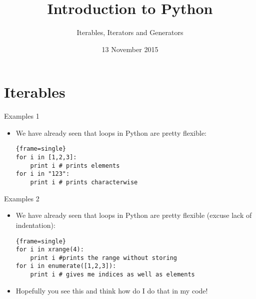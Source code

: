 \documentclass{beamer}
\title{Introduction to Python}
\subtitle{Iterables, Iterators and Generators}
\date{13 November 2015}
\begin{document}
\begin{frame}
  \titlepage
\end{frame}

\section{Iterables}
\begin{frame}[fragile]{Examples 1}
  \begin{itemize}
	\item {We have already seen that loops in Python are pretty flexible:
	\pause
  \begin{block}{}
\begin{lstlisting}{frame=single}
for i in [1,2,3]:
    print i # prints elements
for	i in "123":
    print i # prints characterwise
\end{lstlisting}
\end{block}
	}
  \end{itemize}
\end{frame}
\begin{frame}[fragile]{Examples 2}
  \begin{itemize}
	\item {We have already seen that loops in Python are pretty flexible (excuse lack of indentation):
  \begin{block}{}
\begin{lstlisting}{frame=single}
for i in xrange(4):
    print i #prints the range without storing
for i in enumerate([1,2,3]):
    print i # gives me indices as well as elements
\end{lstlisting}
\end{block}
	}
	\pause
	\item{ Hopefully you see this and think how do I do that in my code!}
  \end{itemize}
\end{frame}
\end{document}
